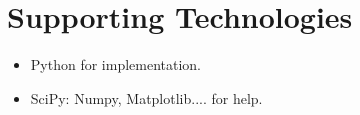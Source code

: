 \chapter*{Supporting Technologies}
%

\begin{itemize}
\item Python for implementation.
\item SciPy: Numpy, Matplotlib.... for help.
\end{itemize}
